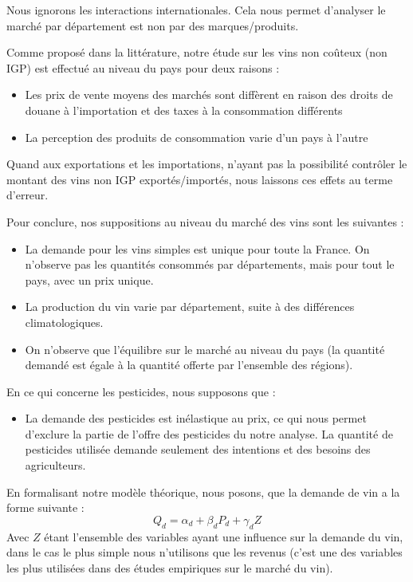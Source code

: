 \documentclass[11pt, a4paper]{article}
\begin{document}
Nous ignorons les interactions internationales. 
Cela nous permet d'analyser le marché par département est non par des marques/produits.
\par
Comme proposé dans la littérature, notre étude sur les vins non coûteux (non IGP) est effectué au niveau du pays \cite{cembalo2014} pour deux raisons :
\begin{itemize}
    \item Les prix de vente moyens des marchés sont diffèrent en raison des droits de douane à l'importation et des taxes à la consommation différents %
    \item La perception des produits de consommation varie d'un pays à l'autre %
\end{itemize}
Quand aux exportations et les importations, n'ayant pas la possibilité contrôler le montant des vins non IGP exportés/importés, nous laissons ces effets au terme d'erreur. 
\par
Pour conclure, nos suppositions au niveau du marché des vins sont les suivantes :
\begin{itemize}
    \item La demande pour les vins simples est unique pour toute la France. On n'observe pas les quantités consommés par départements, mais pour tout le pays, avec un prix unique. 
    \item La production du vin varie par département, suite à des différences climatologiques.
    \item On n'observe que l'équilibre sur le marché au niveau du pays (la quantité demandé est égale à la quantité offerte par l'ensemble des régions).
\end{itemize}
\par
En ce qui concerne les pesticides, nous supposons que :
\begin{itemize}
    \item La demande des pesticides est inélastique au prix, ce qui nous permet d'exclure la partie de l'offre des pesticides du notre analyse. La quantité de pesticides utilisée demande seulement des intentions et des besoins des agriculteurs. 
\end{itemize}
\par
En formalisant notre modèle théorique, nous posons, que la demande de vin a la forme suivante :
\begin{equation}
    Q_d = \alpha_d + \beta_d P_d + \gamma_d Z 
\end{equation}
Avec $Z$ étant l'ensemble des variables ayant une influence sur la demande du vin, dans le cas le plus simple nous n'utilisons que les revenus (c'est une des variables les plus utilisées dans des études empiriques sur le marché du vin).
\end{document}
